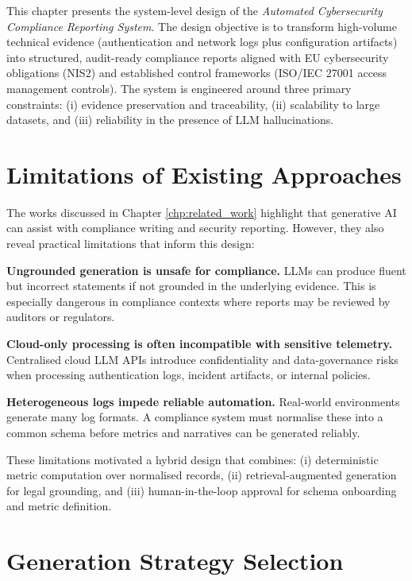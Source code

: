 \documentclass[]{UCD_CS_FYP_Report}
\begin{document}
This chapter presents the system-level design of the \textit{Automated Cybersecurity Compliance Reporting System}. The design objective is to transform high-volume technical evidence (authentication and network logs plus configuration artifacts) into structured, audit-ready compliance reports aligned with EU cybersecurity obligations (NIS2) and established control frameworks (ISO/IEC 27001 access management controls). The system is engineered around three primary constraints: (i) evidence preservation and traceability, (ii) scalability to large datasets, and (iii) reliability in the presence of LLM hallucinations.

\section{Limitations of Existing Approaches}
\label{sec:limitations_existing}

The works discussed in Chapter \ref{chp:related_work} highlight that generative AI can assist with compliance writing and security reporting. However, they also reveal practical limitations that inform this design:

\textbf{Ungrounded generation is unsafe for compliance.} LLMs can produce fluent but incorrect statements if not grounded in the underlying evidence. This is especially dangerous in compliance contexts where reports may be reviewed by auditors or regulators.

\textbf{Cloud-only processing is often incompatible with sensitive telemetry.} Centralised cloud LLM APIs introduce confidentiality and data-governance risks when processing authentication logs, incident artifacts, or internal policies.

\textbf{Heterogeneous logs impede reliable automation.} Real-world environments generate many log formats. A compliance system must normalise these into a common schema before metrics and narratives can be generated reliably.

These limitations motivated a hybrid design that combines: (i) deterministic metric computation over normalised records, (ii) retrieval-augmented generation for legal grounding, and (iii) human-in-the-loop approval for schema onboarding and metric definition.

\section{Generation Strategy Selection}
\label{sec:generation_strategy}
\end{document}

